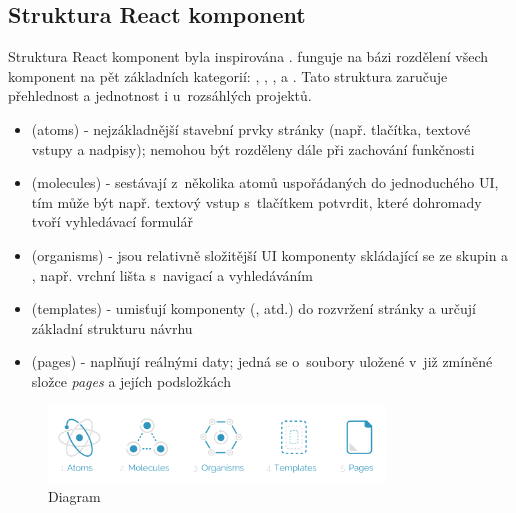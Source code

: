 \documentclass[12pt, a4paper,
  oneside,      %
]{report}
\newenvironment{propertiesItemize}{
\begin{itemize}{ 
  }}
  {\end{itemize}}
\begin{document}
\subsection{Struktura React komponent}\label{subsubsection:reactComponents}
Struktura React komponent byla inspirována .  funguje na bázi rozdělení všech komponent na pět základních kategorií: , , ,  a . Tato struktura zaručuje přehlednost a jednotnost i u~rozsáhlých projektů. \cite{reactComponentsAtomicDesign}
\begin{propertiesItemize}
	\item \textbf{} (atoms) - nejzákladnější stavební prvky stránky (např. tlačítka, textové vstupy a nadpisy); nemohou být rozděleny dále při zachování funkčnosti \cite{reactComponentsAtomicDesign}
	\item \textbf{} (molecules) - sestávají z~několika atomů uspořádaných do jednoduchého UI, tím může být např. textový vstup s~tlačítkem potvrdit, které dohromady tvoří vyhledávací formulář \cite{reactComponentsAtomicDesign}
	\item \textbf{} (organisms) - jsou relativně složitější UI komponenty skládající se ze skupin  a , např. vrchní lišta s~navigací a vyhledáváním \cite{reactComponentsAtomicDesign}
	\item \textbf{} (templates) - umisťují komponenty (, atd.) do rozvržení stránky a určují základní strukturu návrhu \cite{reactComponentsAtomicDesign}
	\item \textbf{} (pages) - naplňují  reálnými daty; jedná se o~soubory uložené v~již zmíněné složce \textit{pages} a jejích podsložkách \cite{reactComponentsAtomicDesign}
\end{propertiesItemize}
\begin{figure}[h]
	\centering
	\includegraphics[width=0.8\textwidth]{images/react_atomic_design.png}
	\caption{Diagram  \cite{reactComponentsAtomicDesignDiagram}}
\end{figure}
\end{document}
